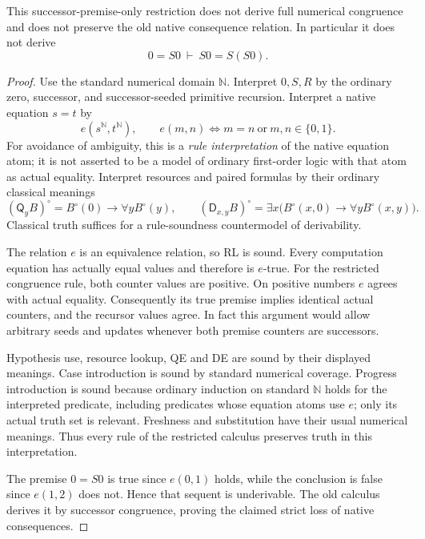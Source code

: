 \begin{proposition}\label{zcc:countermodel}
This successor-premise-only restriction does not derive full numerical
congruence and does not preserve the old native consequence relation.
In particular it does not derive
\[
                         0=S0\ \vdash\ S0=S(S0).
\]
\end{proposition}
\begin{proof}
Use the standard numerical domain $\mathbb N$. Interpret $0,S,R$ by
the ordinary zero, successor, and successor-seeded primitive recursion.
Interpret a native equation $s=t$ by
\[
 e(s^{\mathbb N},t^{\mathbb N}),
 \qquad e(m,n)\iff m=n\ \text{or}\ m,n\in\{0,1\}.
\]
For avoidance of ambiguity, this is a \emph{rule interpretation} of the
native equation atom; it is not asserted to be a model of ordinary
first-order logic with that atom as actual equality. Interpret resources
and paired formulas by their ordinary classical meanings
\[
 (\mathsf Q_yB)^\circ=B^\circ(0)\to\forall yB^\circ(y),\qquad
 (\mathsf D_{x,y}B)^\circ=
 \exists x\bigl(B^\circ(x,0)\to\forall yB^\circ(x,y)\bigr).
\]
Classical truth suffices for a rule-soundness countermodel of derivability.

The relation $e$ is an equivalence relation, so RL is sound. Every
computation equation has actually equal values and therefore is $e$-true.
For the restricted congruence rule, both counter values are positive.
On positive numbers $e$ agrees with actual equality. Consequently its
true premise implies identical actual counters, and the recursor
values agree. In fact this argument would allow arbitrary seeds and
updates whenever both premise counters are successors.

Hypothesis use, resource lookup, QE and DE are sound by their displayed
meanings. Case introduction is sound by standard numerical coverage.
Progress introduction is sound because ordinary induction on standard
$\mathbb N$ holds for the interpreted predicate, including predicates
whose equation atoms use $e$; only its actual truth set is relevant.
Freshness and substitution have their usual numerical meanings.
Thus every rule of the restricted calculus preserves truth in this
interpretation.

The premise $0=S0$ is true since $e(0,1)$ holds, while the conclusion is
false since $e(1,2)$ does not. Hence that sequent is underivable. The old
calculus derives it by successor congruence, proving the claimed strict
loss of native consequences.
\end{proof}

